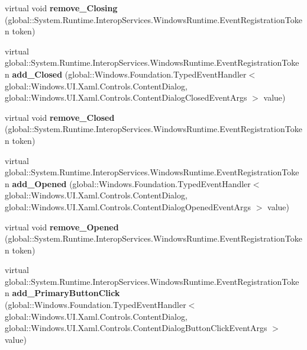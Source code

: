 \begin{DoxyCompactItemize}
virtual void {\bfseries remove\+\_\+\+Closing} (global\+::\+System.\+Runtime.\+Interop\+Services.\+Windows\+Runtime.\+Event\+Registration\+Token token)
\item 
\mbox{\label{class_windows_1_1_u_i_1_1_xaml_1_1_controls_1_1_content_dialog_a6211ece9675f87d6eff022d36ec839af}} 
virtual global\+::\+System.\+Runtime.\+Interop\+Services.\+Windows\+Runtime.\+Event\+Registration\+Token {\bfseries add\+\_\+\+Closed} (global\+::\+Windows.\+Foundation.\+Typed\+Event\+Handler$<$ global\+::\+Windows.\+U\+I.\+Xaml.\+Controls.\+Content\+Dialog, global\+::\+Windows.\+U\+I.\+Xaml.\+Controls.\+Content\+Dialog\+Closed\+Event\+Args $>$ value)
\item 
\mbox{\label{class_windows_1_1_u_i_1_1_xaml_1_1_controls_1_1_content_dialog_aa69d94be955777eb910008418fd76375}} 
virtual void {\bfseries remove\+\_\+\+Closed} (global\+::\+System.\+Runtime.\+Interop\+Services.\+Windows\+Runtime.\+Event\+Registration\+Token token)
\item 
\mbox{\label{class_windows_1_1_u_i_1_1_xaml_1_1_controls_1_1_content_dialog_a140644918023f750ab438dadf16adbc6}} 
virtual global\+::\+System.\+Runtime.\+Interop\+Services.\+Windows\+Runtime.\+Event\+Registration\+Token {\bfseries add\+\_\+\+Opened} (global\+::\+Windows.\+Foundation.\+Typed\+Event\+Handler$<$ global\+::\+Windows.\+U\+I.\+Xaml.\+Controls.\+Content\+Dialog, global\+::\+Windows.\+U\+I.\+Xaml.\+Controls.\+Content\+Dialog\+Opened\+Event\+Args $>$ value)
\item 
\mbox{\label{class_windows_1_1_u_i_1_1_xaml_1_1_controls_1_1_content_dialog_aca373dad7a49f1f4e1bd7b41f5ea7703}} 
virtual void {\bfseries remove\+\_\+\+Opened} (global\+::\+System.\+Runtime.\+Interop\+Services.\+Windows\+Runtime.\+Event\+Registration\+Token token)
\item 
\mbox{\label{class_windows_1_1_u_i_1_1_xaml_1_1_controls_1_1_content_dialog_a3e36b19b3f4893d9fb0f02a0521e5d93}} 
virtual global\+::\+System.\+Runtime.\+Interop\+Services.\+Windows\+Runtime.\+Event\+Registration\+Token {\bfseries add\+\_\+\+Primary\+Button\+Click} (global\+::\+Windows.\+Foundation.\+Typed\+Event\+Handler$<$ global\+::\+Windows.\+U\+I.\+Xaml.\+Controls.\+Content\+Dialog, global\+::\+Windows.\+U\+I.\+Xaml.\+Controls.\+Content\+Dialog\+Button\+Click\+Event\+Args $>$ value)

\end{DoxyCompactItemize}
